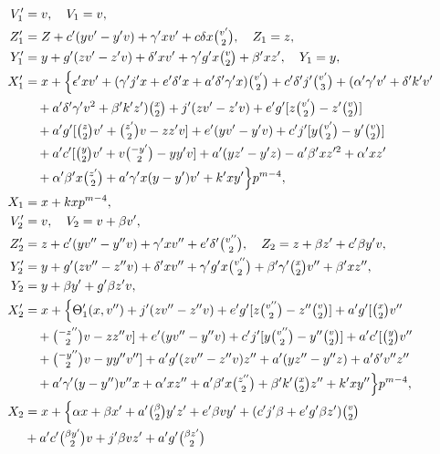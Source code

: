 \documentclass[oneside]{article}
\begin{document}
\begin{align*}
V'_1 &= v, \quad V_1 = v, \\
Z'_1 &= Z + c'(yv' - y'v) + \gamma'xv' + c\delta x\tbinom{v'}{2}, \quad Z_1 = z, \\
Y'_1 &= y + g'(zv' - z'v) + \delta'xv' + \gamma'g'x\tbinom{v}{2} + \beta'xz', \quad Y_1 = y, \\
X'_1 &= x + \Bigl\{\epsilon'xv' + (\gamma'j'x + e'\delta'x + a'\delta'\gamma'x)
    \tbinom{v'}{2} + c'\delta'j'\tbinom{v'}{3} + (\alpha'\gamma'v' + \delta'k'v' \\
  &\quad+ a'\delta'\gamma'v^2 + \beta'k'z')\tbinom{x}{2} + j'(zv' - z'v) +
    e'g'[z\tbinom{v'}{2} - z'\tbinom{v}{2}] \\
  &\quad+ a'g'[\tbinom{z}{2}v' + \tbinom{z'}{2}v - zz'v] + e'(yv' - y'v) +
    c'j'[y\tbinom{v'}{2} - y'\tbinom{v}{2}] \\
  &\quad+ a'c'[\tbinom{y}{2}v' + v\tbinom{-y'}{2} - yy'v] + a'(yz' - y'z)
    - a'\beta'xz'^2 + \alpha'xz' \\
  &\quad+ \alpha'\beta'x\tbinom{z'}{2} + a'\gamma'x(y - y')v' + k'xy'\Bigr\}p^{m-4}, \\
X_1 &= x + kxp^{m-4}, \\
V'_2 &= v, \quad V_2 = v + \beta v', \\
Z'_2 &= z + c'(yv'' - y''v) + \gamma'xv'' + e'\delta'\tbinom{v''}{2},
  \quad Z_2 = z + \beta z' + c'\beta y'v, \\
Y'_2 &= y + g'(zv'' - z''v) + \delta'xv'' + \gamma'g'x\tbinom{v''}{2} +
  \beta'\gamma'\tbinom{x}{2}v'' + \beta'xz'', \\
Y_2 &= y + \beta y' + g'\beta z'v, \\
X'_2 &= x + \Bigl\{\Theta'_1(x, v'') + j'(zv'' - z''v) + e'g'[z\tbinom{v''}{2} -
    z''\tbinom{v}{2}] + a'g'[\tbinom{x}{2}v'' \\
 &\quad+ \tbinom{-z''}{2}v - zz''v] + e'(yv'' - y''v) + c'j'[y\tbinom{v''}{2}
    - y''\tbinom{v}{2}] + a'c'[\tbinom{y}{2}v'' \\
 &\quad+ \tbinom{-y''}{2}v - yy''v''] + a'g'(zv'' - z''v)z'' + a'(yz'' - y''z)
    + a'\delta'v''z'' \\
 &\quad+ a'\gamma'(y - y'')v''x + \alpha'xz'' + a'\beta'x\tbinom{z''}{2}
    + \beta'k'\tbinom{x}{2}z'' + k'xy''\Bigr\}p^{m-4}, \\
X_2 &= x + \Bigl\{\alpha x + \beta x' + a'\tbinom{\beta}{2}y'z' + e'\beta vy' +
    (c'j'\beta + e'g'\beta z')\tbinom{v}{2} \\
  &+ a'c'\tbinom{\beta y'}{2}v + j'\beta vz' + a'g'\tbinom{\beta z'}{2}

\end{align*}
\end{document}
